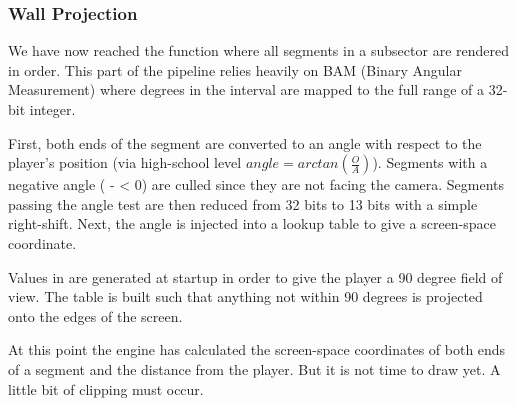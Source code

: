 \subsubsection{Wall Projection}
We have now reached the  function where all segments in a subsector are rendered in order. This part of the pipeline relies heavily on BAM (Binary Angular Measurement) where degrees in the interval \cw{[0, 360]} are mapped to the full range of a 32-bit integer.\\
\par
{}
\par
First, both ends of the segment are converted to an angle with respect to the player's position (via high-school level $angle = arctan(\frac{O}{A})$). Segments with a negative angle ( -  < 0) are culled since they are not facing the camera. Segments passing the angle test are then reduced from 32 bits to 13 bits with a simple right-shift. Next, the angle is injected into a lookup table  to give a screen-space  coordinate.\\
 \par
\vspace{2mm}
\par
Values in  are generated at startup in order to give the player a 90 degree field of view. The table is built such that anything not within 90 degrees is projected onto the edges of the screen. 
\par
\vspace{1cm}
\par
At this point the engine has calculated the screen-space  coordinates of both ends of a segment and the distance  from the player. But it is not time to draw yet. A little bit of clipping must occur. 






